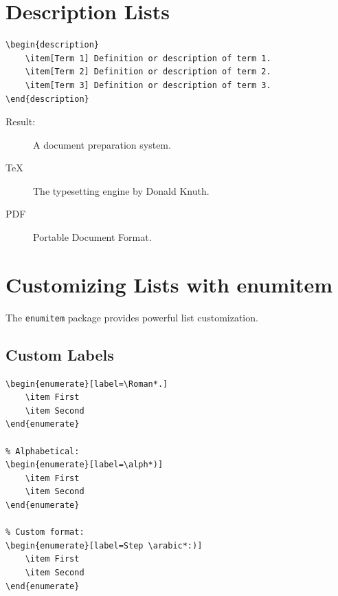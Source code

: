 \section{Description Lists}

\begin{lstlisting}[language={[LaTeX]TeX}, caption=Description list]
\begin{description}
    \item[Term 1] Definition or description of term 1.
    \item[Term 2] Definition or description of term 2.
    \item[Term 3] Definition or description of term 3.
\end{description}
\end{lstlisting}

Result:
\begin{description}
    \item[\latex{}] A document preparation system.
    \item[TeX] The typesetting engine by Donald Knuth.
    \item[PDF] Portable Document Format.
\end{description}

\section{Customizing Lists with enumitem}

The \texttt{enumitem} package provides powerful list customization.

\subsection{Custom Labels}

\begin{lstlisting}[language={[LaTeX]TeX}, caption=Custom enumerate labels]
% Roman numerals:
\begin{enumerate}[label=\Roman*.]
    \item First
    \item Second
\end{enumerate}

% Alphabetical:
\begin{enumerate}[label=\alph*)]
    \item First
    \item Second
\end{enumerate}

% Custom format:
\begin{enumerate}[label=Step \arabic*:)]
    \item First
    \item Second
\end{enumerate}
\end{lstlisting}

